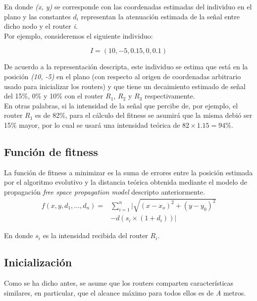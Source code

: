 \documentclass[journal]{IEEEtran}
\begin{document}
En donde \textit{(x, y)} se corresponde con las coordenadas estimadas del individuo en el plano y las constantes $d_i$ representan la atenuación estimada de la señal entre dicho nodo y el router \textit{i}.\\

Por ejemplo, consideremos el siguiente individuo:

$$I = (10, -5, 0.15, 0, 0.1)$$

De acuerdo a la representación descripta, este individuo se estima que está en la posición \textit{(10, -5)} en el plano (con respecto al origen de coordenadas arbitrario usado para inicializar los routers) y que tiene un decaimiento estimado de señal del 15\%, 0\% y 10\% con el router $R_1$, $R_2$ y $R_3$ respectivamente.\\

En otras palabras, si la intensidad de la señal que percibe de, por ejemplo, el router $R_1$ es de 82\%, para el cálculo del fitness se asumirá que la misma debió ser 15\% mayor, por lo cual se usará una intensidad teórica de $82 \times 1.15 = 94\%$.\\

\subsection{Función de fitness}

La función de fitness a minimizar es la suma de errores entre la posición estimada por el algoritmo evolutivo y la distancia teórica obtenida mediante el modelo de propagación \emph{free space propagation model} descripto anteriormente.\\

\begin{equation*}
\begin{split}
f(x, y, d_1, ..., d_n) = &\sum_{i=1}^{n} |\sqrt{(x-x_o)^2 + (y-y_0)^2} \\
&- d(s_i \times (1 + d_i))|
\end{split}
\end{equation*}

En donde $s_i$ es la intensidad recibida del router $R_i$.\\

\subsection{Inicialización}

Como se ha dicho antes, se asume que los routers comparten características similares, en particular, que el alcance máximo para todos ellos es de \textit{A} metros.\\
\end{document}
